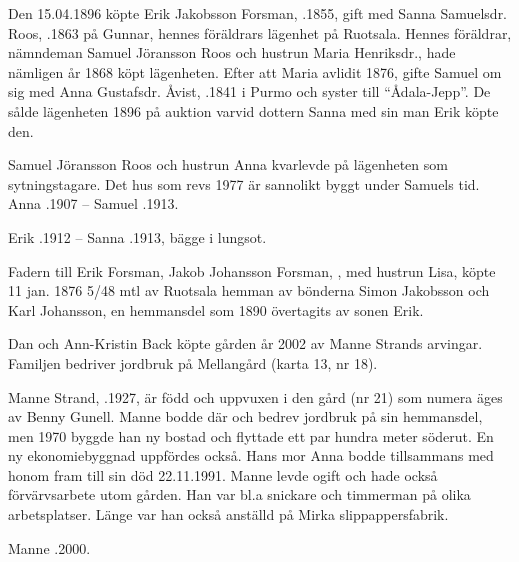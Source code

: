 Den 15.04.1896 köpte Erik Jakobsson Forsman, .1855, gift med Sanna Samuelsdr. Roos, .1863 på Gunnar, hennes föräldrars lägenhet på Ruotsala. Hennes föräldrar, nämndeman  Samuel Jöransson Roos och hustrun Maria Henriksdr., hade nämligen år 1868 köpt lägenheten. Efter att Maria avlidit 1876, gifte Samuel om sig med Anna Gustafsdr. Åvist, .1841 i Purmo och syster till ``Ådala-Jepp''. De sålde lägenheten 1896 på auktion varvid  dottern Sanna med sin man Erik köpte den.
\begin{jhchildren}
  \item {}
  \item {}
  \item {}
  \item {}
  \item {}
  \item {}
\end{jhchildren}

Samuel Jöransson Roos och hustrun Anna kvarlevde på lägenheten som sytningstagare. Det hus som revs 1977 är sannolikt byggt under Samuels tid. Anna .1907  --  Samuel .1913.

Erik .1912  --  Sanna .1913, bägge i lungsot.


Fadern till Erik Forsman, Jakob Johansson Forsman, , med hustrun Lisa,  köpte 11 jan. 1876  5/48 mtl av Ruotsala hemman av bönderna Simon Jakobsson och Karl Johansson, en hemmansdel som 1890 övertagits av sonen Erik.\jhvspace{}






Dan och Ann-Kristin Back köpte gården år 2002 av Manne Strands arvingar. Familjen bedriver jordbruk på Mellangård (karta 13, nr 18).\jhvspace{}


Manne Strand, .1927, är född och uppvuxen i den gård (nr 21) som numera äges av Benny Gunell. Manne bodde där och bedrev jordbruk på sin hemmansdel, men 1970 byggde han ny bostad och flyttade ett  par hundra meter söderut. En ny ekonomiebyggnad uppfördes också. Hans mor Anna bodde tillsammans med honom fram till sin död 22.11.1991. Manne levde ogift och hade också förvärvsarbete utom gården. Han var bl.a snickare och timmerman på olika arbetsplatser. Länge var han också anställd på Mirka slippappersfabrik.

Manne .2000.
